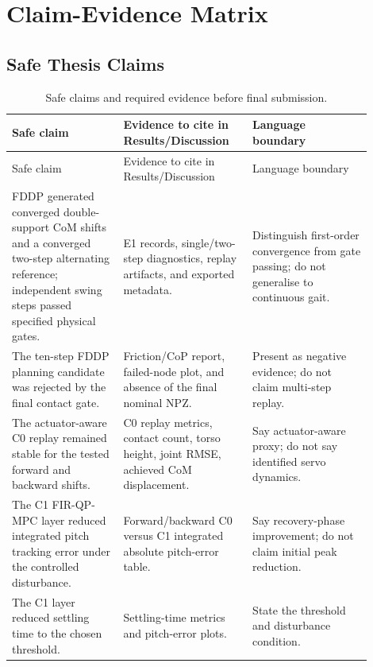 \documentclass[12pt,a4paper]{report}
\begin{document}
\appendix
 
\chapter{Claim-Evidence Matrix}
 
\section{Safe Thesis Claims}
 
\begin{longtable}{@{}p{0.28\linewidth}p{0.32\linewidth}p{0.30\linewidth}@{}}
\caption{Safe claims and required evidence before final submission.}\label{tab:claim_evidence_matrix}\\
\toprule
Safe claim & Evidence to cite in Results/Discussion & Language boundary \\
\midrule
\endfirsthead
\toprule
Safe claim & Evidence to cite in Results/Discussion & Language boundary \\
\midrule
\endhead
FDDP generated converged double-support CoM shifts and a converged two-step alternating reference; independent swing steps passed specified physical gates. & E1 records, single/two-step diagnostics, replay artifacts, and exported metadata. & Distinguish first-order convergence from gate passing; do not generalise to continuous gait. \\
The ten-step FDDP planning candidate was rejected by the final contact gate. & Friction/CoP report, failed-node plot, and absence of the final nominal NPZ. & Present as negative evidence; do not claim multi-step replay. \\
The actuator-aware C0 replay remained stable for the tested forward and backward shifts. & C0 replay metrics, contact count, torso height, joint RMSE, achieved CoM displacement. & Say actuator-aware proxy; do not say identified servo dynamics. \\
The C1 FIR-QP-MPC layer reduced integrated pitch tracking error under the controlled disturbance. & Forward/backward C0 versus C1 integrated absolute pitch-error table. & Say recovery-phase improvement; do not claim initial peak reduction. \\
The C1 layer reduced settling time to the chosen threshold. & Settling-time metrics and pitch-error plots. & State the threshold and disturbance condition. \\

\end{longtable}
\end{document}
